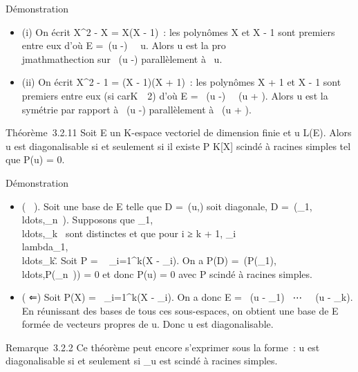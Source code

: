 \documentclass[]{article}
\begin{document}
Démonstration

\begin{itemize}
\itemsep1pt\parskip0pt
\item
  (i) On écrit X^2 - X = X(X - 1)~: les polynômes X et X - 1
  sont premiers entre eux d'où E =\
  \mathrmKer(u -\mathrmId)
  \oplus~\mathrmKer~u. Alors u est
  la pro\\jmathmathection sur
  \mathrmKer~(u
  -\mathrmId) parallèlement à
  \mathrmKer~u.
\item
  (ii) On écrit X^2 - 1 = (X - 1)(X + 1)~: les polynômes X +
  1 et X - 1 sont premiers entre eux (si
  carK\mathrel\neq~~2) d'où E
  = \mathrmKer~(u
  -\mathrmId)
  \oplus~\mathrmKer~(u +
  \mathrmId). Alors u est la symétrie par rapport à
  \mathrmKer~(u
  -\mathrmId) parallèlement à
  \mathrmKer~(u +
  \mathrmId).
\end{itemize}

Théorème~3.2.11 Soit E un K-espace vectoriel de dimension finie et u \in
L(E). Alors u est diagonalisable si et seulement si il existe P \in
K{[}X{]} scindé à racines simples tel que P(u) = 0.

Démonstration

\begin{itemize}
\itemsep1pt\parskip0pt
\item
  ( \rigtharrow~). Soit  une base de E telle que D =\
  \mathrmMat (u,) soit diagonale, D
  =\
  \mathrmdiag(\lambda_1,\\ldots,\lambda_n~).
  Supposons que
  \lambda_1,\\ldots,\lambda_k~
  sont distinctes et que pour i ≥ k + 1, \lambda_i
  \in\\lambda_1,\\ldots\lambda_k\~.
  Soit P = \∏ ~
  _i=1^k(X - \lambda_i). On a P(D)
  =\
  \mathrmdiag(P(\lambda_1),\\ldots,P(\lambda_n~))
  = 0 et donc P(u) = 0 avec P scindé à racines simples.
\item
  ( ⇐) Soit P(X) =\ \∏
   _i=1^k(X - \lambda_i). On a donc E
  = \mathrmKer~(u -
  \lambda_1\mathrmId)
  \oplus~⋯
  \oplus~\mathrmKer~(u -
  \lambda_k\mathrmId). En réunissant des bases de
  tous ces sous-espaces, on obtient une base de E formée de vecteurs
  propres de u. Donc u est diagonalisable.
\end{itemize}

Remarque~3.2.2 Ce théorème peut encore s'exprimer sous la forme~: u est
diagonalisable si et seulement si \mu_u est scindé à racines
simples.
\end{document}
